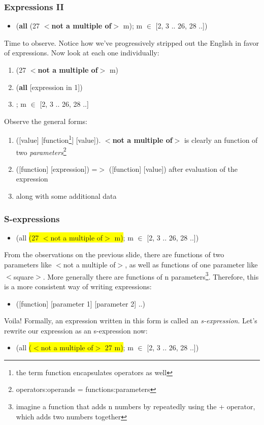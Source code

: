 {
  \frametitle{Expressions II}
  \begin{itemize}
    \item[] (\textbf{all} (27 \textbf{$<$not a multiple of$>$} m); m \textbf{$\in$} [2, 3 .. 26, 28 ..])
  \end{itemize}
  Time to observe. Notice how we've progressively stripped out the English in favor of expressions. Now look at each one individually:
  \begin{enumerate}
    \item (27 \textbf{$<$not a multiple of$>$} m)
    \item (\textbf{all} [expression in 1])
    \item[3.] [expression in 2]; m \textbf{$\in$} [2, 3 .. 26, 28 ..]
  \end{enumerate}
  Observe the general forms:
  \begin{enumerate}
    \item ([value] [function\footnote{the term function encapsulates operators as well}] [value]). \textbf{$<$not a multiple of$>$} is clearly an function of two \textit{parameters}\footnote{operators:operands = functions:parameters}
    \item ([function] [expression]) =$>$ ([function] [value]) after evaluation of the expression
    \item[3.] [expression] along with some additional data
  \end{enumerate}
}
\frame
{
  \frametitle{S-expressions}
  \begin{itemize}
    \item[] (all \colorbox{yellow}{(27 $<$not a multiple of$>$ m)}; m $\in$ [2, 3 .. 26, 28 ..])
  \end{itemize}
  From the observations on the previous slide, there are functions of two parameters like $<$not a multiple of$>$, as well as functions of one parameter like $<$square$>$. More generally there are functions of n parameters\footnote{imagine a function that adds n numbers by repeatedly using the + operator, which adds two numbers together}. Therefore, this is a more consistent way of writing expressions:
  \begin{itemize}
    \item[] ([function] [parameter 1] [parameter 2] ..)
  \end{itemize}
  Voila! Formally, an expression written in this form is called an \textit{s-expression}. Let's rewrite our expression as an s-expression now:
  \begin{itemize}
    \item[] (all \colorbox{yellow}{($<$not a multiple of$>$ 27 m)}; m $\in$ [2, 3 .. 26, 28 ..])
  \end{itemize}
}
